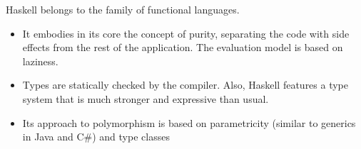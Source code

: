Haskell belongs to the family of functional languages.
\begin{itemize}
  \item It embodies in its core the concept of purity, separating the code with
side eﬀects from the rest of the application.
The evaluation model is based on laziness.
  \item Types are statically checked by the compiler. Also, Haskell features a
type system that is much stronger and expressive than usual.
  \item Its approach to polymorphism is based on parametricity (similar to
generics in Java and C#) and type classes
\end{itemize}
